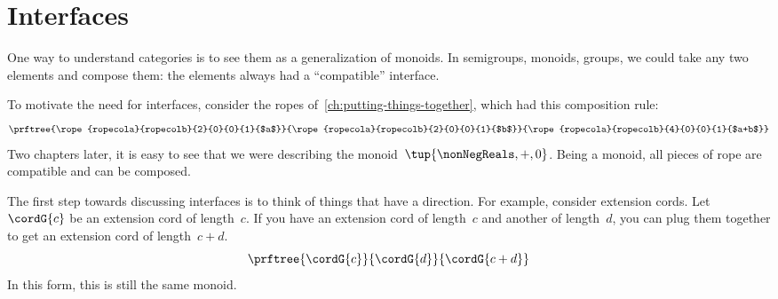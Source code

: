 
\section{Interfaces}\label{sec:interfaces}

One way to understand categories is to see them as a generalization of monoids.
In semigroups, monoids, groups, we could take any two elements and compose them: the elements always had a ``compatible'' interface.

To motivate the need for interfaces, consider the ropes of~\cref{ch:putting-things-together}, which had this composition rule:
%
\begin{equation*}
    \prftree{\rope{ropecola}{ropecolb}{2}{0}{0}{1}{$a$}}
    {\rope{ropecola}{ropecolb}{2}{0}{0}{1}{$b$}}
    {\rope{ropecola}{ropecolb}{4}{0}{0}{1}{$a+b$}}
\end{equation*}
%
Two chapters later, it is easy to see that we were describing the monoid~$\tup{\nonNegReals, +, 0}$.
Being a monoid, all pieces of rope are compatible and can be composed.

The first step towards discussing interfaces is to think of things that have a direction.
For example, consider extension cords.
Let~$\cordG{c}$ be an extension cord of length~$c$.
If you have an extension cord of length~$c$ and another of length~$d$, you can plug them together to get an extension cord of length~$c+d$.
%
\begin{equation}
    \label{eq:cords}
    \prftree{\cordG{c}}{\cordG{d}}{\cordG{c+d}}
\end{equation}
%
In this form, this is still the same monoid.

